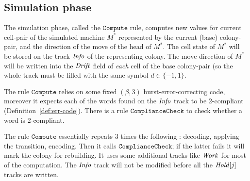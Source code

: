 \documentclass[11pt]{memoir}
\theoremstyle{definition} %
\newcommand{\fld}[1]{\ensuremath{\textit{#1\/}}}
\newcommand{\rul}[1]{\ensuremath{\texttt{#1}}}
\newcommand{\Drift}{\fld{Drift}}
\newcommand{\Hold}{\fld{Hold}}
\newcommand{\Info}{\fld{Info}}
\newcommand{\Work}{\fld{Work}} %
\newcommand{\Compute}{\rul{Compute}}
\begin{document}
\subsection{Simulation phase}\label{sec:simulation-phase}

The simulation phase, called the \( \Compute \) rule, computes new values for current cell-pair of the
simulated machine \( M^{*} \) represented by the current (base) colony-pair,
and the direction of the move of the head of  \( M^{*} \).
The cell state of \( M^{*} \) will be stored on the track \( \Info \) of the
representing colony.
The move direction of \( M^{*} \) 
will be written into the \( \Drift \) field of \emph{each} cell of the base colony-pair
(so the whole track must be filled with the same symbol \( d\in\{-1,1\} \).

The rule \( \Compute \) relies on some fixed \( (\beta,3) \) burst-error-correcting
code, moreover it expects each of the words found on the \( \Info \) track to be
2-compliant (Definition~\ref{def:err-code}).  %
There is a rule \( \rul{ComplianceCheck} \) to check whether a word is \( 2 \)-compliant.

The rule \( \Compute \) essentially repeats 3 times %
the following : decoding, applying the transition, encoding.
Then it calls \( \rul{ComplianceCheck} \); if the latter fails
it will mark the colony for rebuilding.
It uses some additional tracks like \( \Work \) for most of the computation.
 The \( \Info \) track will not be modified before all the \( \Hold[j] \) tracks are written.
\end{document}
